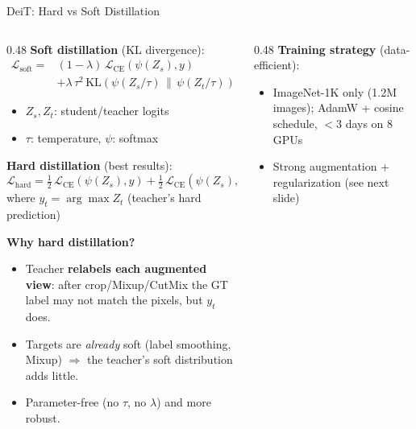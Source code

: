\begin{frame}{DeiT: Hard vs Soft Distillation}

  \begin{columns}
    \begin{column}{0.48\textwidth}
      \textbf{Soft distillation} (KL divergence):
      \begin{align*}
        \mathcal{L}_\text{soft} = {}& (1{-}\lambda)\,\mathcal{L}_\text{CE}(\psi(Z_s), y) \\
        &+ \lambda\,\tau^2\, \text{KL}(\psi(Z_s/\tau) \,\|\, \psi(Z_t/\tau))
      \end{align*}
      \begin{itemize}
        \item $Z_s, Z_t$: student/teacher logits
        \item $\tau$: temperature, $\psi$: softmax
      \end{itemize}

      \vspace{0.5em}
      \textbf{Hard distillation} (best results):
      \[
        \mathcal{L}_\text{hard} = \tfrac{1}{2}\,\mathcal{L}_\text{CE}(\psi(Z_s), y) + \tfrac{1}{2}\,\mathcal{L}_\text{CE}(\psi(Z_s), y_t)
      \]
      where $y_t = \arg\max Z_t$ (teacher's hard prediction)

      \vspace{0.4em}
      \textbf{Why hard distillation?}
      {\footnotesize
      \begin{itemize}\itemsep1pt
        \item Teacher \textbf{relabels each augmented view}: after crop/Mixup/CutMix the GT label may not match the pixels, but $y_t$ does.
        \item Targets are \emph{already} soft (label smoothing, Mixup) $\Rightarrow$ the teacher's soft distribution adds little.
        \item Parameter-free (no $\tau$, no $\lambda$) and more robust.
      \end{itemize}}
    \end{column}
    \begin{column}{0.48\textwidth}
      \textbf{Training strategy} (data-efficient):
      {\footnotesize
      \begin{itemize}\itemsep1pt
        \item ImageNet-1K only (1.2M images); AdamW + cosine schedule, $<3$ days on 8 GPUs
        \item Strong augmentation + regularization (see next slide)
      \end{itemize}}


\end{column}
\end{columns}
\end{frame}

